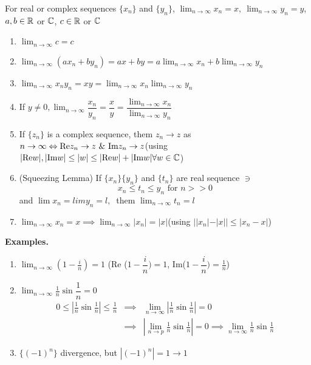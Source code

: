 \begin{thm}
	For real or complex sequences $\{x_n\}$ and $\{y_n\}$, $\lim_{n \rightarrow \infty} x_n = x,~\lim_{n \rightarrow \infty} y_n = y$, $a,b \in \mathbb{R}$ or $\mathbb{C}$, $c \in \mathbb{R}$ or $\mathbb{C}$
	
	\begin{enumerate}
		\item $\lim_{n \rightarrow \infty} c = c$
		\item $\lim_{n \rightarrow \infty} (ax_n + by_n) = ax+by = a\lim_{n \rightarrow \infty} x_n + b\lim_{n \rightarrow \infty}y_n$
		\item $\lim_{n \rightarrow \infty} x_ny_n = xy = \lim_{n \rightarrow \infty}x_n \lim_{n \rightarrow \infty}y_n$
		\item If $y \neq 0, \lim_{n \rightarrow \infty} \dfrac{x_n}{y_n} = \dfrac{x}{y} = \dfrac{\lim_{n \rightarrow \infty}x_n}{\lim_{n \rightarrow \infty} y_n}$
		\item If $\{z_n\}$ is a complex sequence, them $z_n \rightarrow z$ as $n \rightarrow \infty \Leftrightarrow \\ \text{Re}z_n \rightarrow z ~\&~ \text{Im}z_n \rightarrow z$(using $|\text{Re} w|, |\text{Im} w| \leq |w| \leq |\text{Re}w|+|\text{Im}w| \forall w \in \mathbb{C}$)
		\item (Squeezing Lemma) If $\{x_n\}\{y_n\}$ and $\{t_n\}$ are real sequence $\ni$
		 $$x_n \leq t_n \leq y_n \text{ for } n >> 0$$
		 and $\lim x_n = lim y_n = l,~$ them $\lim_{n \rightarrow \infty} t_n = l$
		 \item $\lim_{n \rightarrow \infty} x_n = x \implies \lim_{n \rightarrow \infty}|x_n| = |x|$(using $||x_n| - |x|| \leq |x_n - x|$)
	\end{enumerate}
\end{thm}

\textbf{Examples.} 

\begin{enumerate}[wide,label = $(\roman*)$]
	\item $\lim_{n \rightarrow \infty}(1 - \frac{i}{n}) = 1$ (Re ($1 - \dfrac{i}{n}) = 1$, Im($1 - \dfrac{i}{n}) = \frac{1}{n}$)
	\item $\lim_{n \rightarrow \infty} \frac{1}{n} \sin \dfrac{1}{n} = 0$
	\begin{eqnarray*}
		0 \leq |\frac{1}{n}\sin \frac{1}{n} | \leq \frac{1}{n} &\implies& \lim_{n \rightarrow \infty}|\frac{1}{n} \sin \frac{1}{n}| = 0\\
		&\implies & |\lim_{n \rightarrow p} \frac{1}{n} \sin \frac{1}{n} | = 0 \implies \lim_{n \rightarrow \infty} \frac{1}{n} \sin \frac{1}{n}
	\end{eqnarray*}
	\item $\{(-1)^n\}$ divergence, but $|(-1)^n| = 1 \rightarrow 1$
\end{enumerate}

